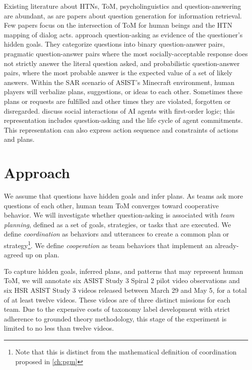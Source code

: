 Existing literature about HTNs, ToM, psycholinguistics and question-answering
are abundant, as are papers about question generation for information
retrieval. Few papers focus on the intersection of ToM for human beings and the
HTN mapping of dialog acts. \citet{hawkins_goodman_2017}
approach question-asking as evidence of the questioner’s hidden goals. They
categorize questions into binary question-answer pairs, pragmatic
question-answer pairs where the most socially-acceptable response does not
strictly answer the literal question asked, and probabilistic question-answer
pairs, where the most probable answer is the expected value of a set of likely
answers. Within the SAR scenario of ASIST’s Minecraft environment, human
players will verbalize plans, suggestions, or ideas to each other. Sometimes
these plans or requests are fulfilled and other times they are violated,
forgotten or disregarded. \citet{DBLP:conf/atal/BaldoniBCM19} discuss social
interactions of AI agents with first-order logic; this representation includes
question-asking and the life cycle of agent commitments. This representation
can also express action sequence and constraints of actions and plans.

\section{Approach}

We assume that questions have hidden goals and infer plans. As teams ask more
questions of each other, human team ToM converges toward cooperative behavior.
We will investigate whether question-asking is associated with \emph{team
planning}, defined as a set of goals, strategies, or tasks that are executed.
We define \emph{coordination} as behaviors and utterances to create a common
plan or strategy\footnote{Note that this is distinct from the mathematical
definition of coordination proposed in \autoref{ch:pgm}}. We define
\emph{cooperation} as team behaviors that implement an already-agreed up on
plan.

To capture hidden goals, inferred plans, and patterns that may represent human
ToM, we will annotate six ASIST Study 3 Spiral 2 pilot video observations and
six HSR ASIST Study 3 videos released between March 29 and May 5, for a total
of at least twelve videos. These videos are of three distinct missions for each
team. Due to the expensive costs of taxonomy label development with strict
adherence to grounded theory methodology, this stage of the experiment is
limited to no less than twelve videos. 

